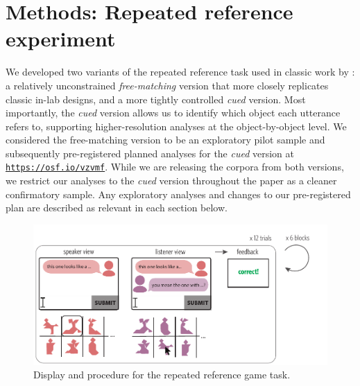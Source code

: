 \documentclass[alpha-refs]{wiley-article}
\begin{document}




\section{Methods: Repeated reference experiment}

We developed two variants of the repeated reference task used in classic work by \cite{ClarkWilkesGibbs86_ReferringCollaborative}: a relatively unconstrained \emph{free-matching} version that more closely replicates classic in-lab designs, and a more tightly controlled \emph{cued} version.
Most importantly, the \emph{cued} version allows us to identify which object each utterance refers to, supporting higher-resolution analyses at the object-by-object level.
We considered the free-matching version to be an exploratory pilot sample and subsequently pre-registered planned analyses for the \emph{cued} version at \mbox{\texttt{\url{https://osf.io/vzvmf}}}.
While we are releasing the corpora from both versions, we restrict our analyses to the \emph{cued} version throughout the paper as a cleaner confirmatory sample.
Any exploratory analyses and changes to our pre-registered plan are described as relevant in each section below.

\begin{figure}
\centering
\vspace{-1em}
\includegraphics[scale=.87]{designAndExample.pdf}
\caption{Display and procedure for the repeated reference game task.}
\label{fig:design}
\end{figure}
\end{document}
